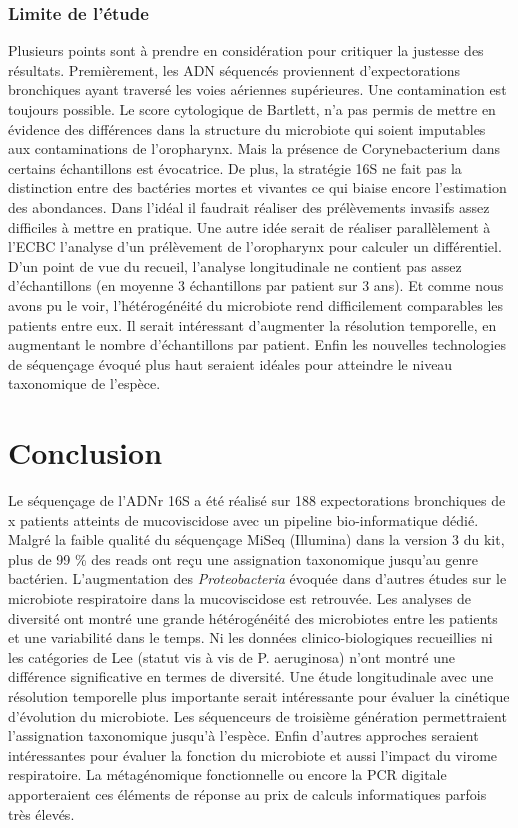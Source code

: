\documentclass[12pt,a4paper]{article}
\begin{document}
{\subsubsection{Limite de l'étude}
Plusieurs points sont à prendre en considération pour critiquer la justesse des résultats. Premièrement, les ADN séquencés proviennent d'expectorations bronchiques ayant traversé les voies aériennes supérieures. Une contamination est toujours possible. Le score cytologique de Bartlett, n'a pas permis de mettre en évidence des différences dans la structure du microbiote qui soient imputables aux contaminations de l'oropharynx. Mais la présence de Corynebacterium dans certains échantillons est évocatrice. 
De plus, la stratégie 16S ne fait pas la distinction entre des bactéries mortes et vivantes ce qui biaise encore l'estimation des abondances. 
Dans l'idéal il faudrait réaliser des prélèvements invasifs assez difficiles à mettre en pratique. Une autre idée serait de réaliser parallèlement à l'ECBC l'analyse d'un prélèvement de l'oropharynx pour calculer un différentiel. \\
D'un point de vue du recueil, l'analyse longitudinale ne contient pas assez d'échantillons (en moyenne 3 échantillons par patient sur 3 ans). Et comme nous avons pu le voir, l'hétérogénéité du microbiote rend difficilement comparables les patients entre eux. Il serait intéressant d'augmenter la résolution temporelle, en augmentant le nombre d'échantillons par patient. 
Enfin les nouvelles technologies de séquençage évoqué plus haut seraient idéales pour atteindre le niveau taxonomique de l'espèce. 


\section{Conclusion}
Le séquençage de l'ADNr 16S a été réalisé sur 188 expectorations bronchiques de x patients atteints de mucoviscidose avec un pipeline bio-informatique dédié. Malgré la faible qualité du séquençage MiSeq (Illumina) dans la version 3 du kit, plus de 99 \% des reads ont reçu une assignation taxonomique jusqu'au genre bactérien. L'augmentation des \textit{Proteobacteria} évoquée dans d'autres études sur le microbiote respiratoire dans la mucoviscidose est retrouvée. Les analyses de diversité ont montré une grande hétérogénéité des microbiotes entre les patients et une variabilité dans le temps. 
Ni les données clinico-biologiques recueillies ni les catégories de Lee (statut vis à vis de P. aeruginosa) n'ont montré une différence significative en termes de diversité. 
Une étude longitudinale avec une résolution temporelle plus importante serait intéressante pour évaluer la cinétique d'évolution du microbiote. Les séquenceurs de troisième génération permettraient l'assignation taxonomique jusqu'à l'espèce.
Enfin d'autres approches seraient intéressantes pour évaluer la fonction du microbiote et aussi l'impact du virome respiratoire. La métagénomique fonctionnelle ou encore la PCR digitale apporteraient ces éléments de réponse au prix de calculs informatiques parfois très élevés.


}
\end{document}
